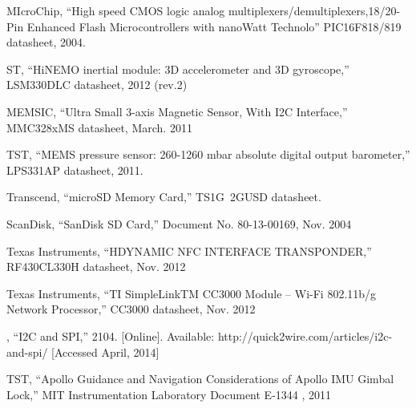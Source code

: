 \documentclass{report}
\begin{document}
  \begin{thebibliography}{1}

\bibitem [1] MIcroChip, “High speed CMOS logic analog
multiplexers/demultiplexers,18/20-Pin Enhanced Flash Microcontrollers
with nanoWatt Technolo” PIC16F818/819 datasheet,  2004.

\bibitem [2] ST, “HiNEMO inertial module:
3D accelerometer and 3D gyroscope,” LSM330DLC datasheet, 2012 (rev.2)

\bibitem [3] MEMSIC, “Ultra Small 3-axis Magnetic
Sensor, With I2C Interface,” MMC328xMS datasheet, March. 2011

\bibitem [4] TST, “MEMS pressure sensor: 260-1260 mbar absolute digital output
barometer,” LPS331AP datasheet, 2011.

\bibitem [5] Transcend, “microSD Memory Card,” TS1G~2GUSD datasheet.

\bibitem [6] ScanDisk, “SanDisk SD Card,” Document No. 80-13-00169, Nov. 2004

\bibitem [7] Texas Instruments, “HDYNAMIC NFC INTERFACE TRANSPONDER,” RF430CL330H datasheet, Nov. 2012 

\bibitem [8] Texas Instruments, “TI SimpleLinkTM CC3000 Module – Wi-Fi 802.11b/g Network Processor,” CC3000 datasheet, Nov. 2012 

\bibitem [9] , “I2C and SPI,” 2104. [Online]. Available: http://quick2wire.com/articles/i2c-and-spi/ [Accessed April, 2014]

\bibitem [10] TST, “Apollo Guidance and Navigation 
Considerations of Apollo IMU Gimbal Lock,” MIT Instrumentation Laboratory Document E-1344 , 2011

 \end{thebibliography}

 
\end{document}
